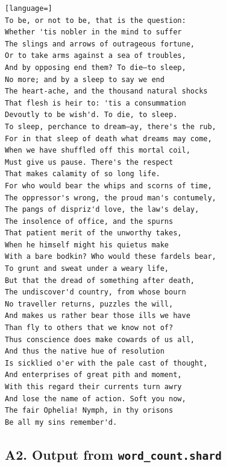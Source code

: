 \documentclass[oneside]{report}
\begin{document}
\lstset{xleftmargin=15pt}
\begin{lstlisting}[language=]
To be, or not to be, that is the question:
Whether 'tis nobler in the mind to suffer
The slings and arrows of outrageous fortune,
Or to take arms against a sea of troubles,
And by opposing end them? To die—to sleep,
No more; and by a sleep to say we end
The heart-ache, and the thousand natural shocks
That flesh is heir to: 'tis a consummation
Devoutly to be wish'd. To die, to sleep.
To sleep, perchance to dream—ay, there's the rub,
For in that sleep of death what dreams may come,
When we have shuffled off this mortal coil,
Must give us pause. There's the respect
That makes calamity of so long life.
For who would bear the whips and scorns of time,
The oppressor's wrong, the proud man's contumely,
The pangs of dispriz'd love, the law's delay,
The insolence of office, and the spurns
That patient merit of the unworthy takes,
When he himself might his quietus make
With a bare bodkin? Who would these fardels bear,
To grunt and sweat under a weary life,
But that the dread of something after death,
The undiscover'd country, from whose bourn
No traveller returns, puzzles the will,
And makes us rather bear those ills we have
Than fly to others that we know not of?
Thus conscience does make cowards of us all,
And thus the native hue of resolution
Is sicklied o'er with the pale cast of thought,
And enterprises of great pith and moment,
With this regard their currents turn awry
And lose the name of action. Soft you now,
The fair Ophelia! Nymph, in thy orisons
Be all my sins remember'd.
\end{lstlisting}

\subsection{A2. Output from \texttt{word\_count.shard}}
\end{document}
